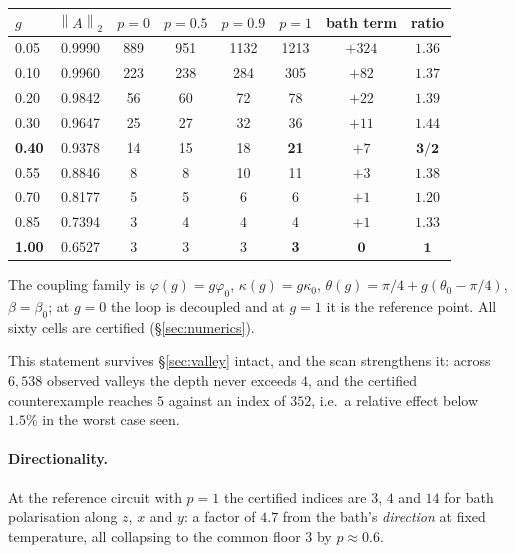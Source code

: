 \documentclass[11pt,a4paper]{article}
\theoremstyle{definition}
\theoremstyle{remark}
\newcommand{\opn}[1]{\left\lVert #1 \right\rVert_{2}}
\begin{document}
\begin{center}
\begin{tabular}{lccccccc}
\toprule
$g$ & $\opn{A}$ & $p=0$ & $p=0.5$ & $p=0.9$ & $p=1$ & bath term & ratio\\
\midrule
0.05 & 0.9990 & 889 & 951 & 1132 & 1213 & $+324$ & $1.36$\\
0.10 & 0.9960 & 223 & 238 & 284 & 305 & $+82$ & $1.37$\\
0.20 & 0.9842 & 56 & 60 & 72 & 78 & $+22$ & $1.39$\\
0.30 & 0.9647 & 25 & 27 & 32 & 36 & $+11$ & $1.44$\\
\textbf{0.40} & 0.9378 & 14 & 15 & 18 & \textbf{21} & $+7$ & $\mathbf{3/2}$\\
0.55 & 0.8846 & 8 & 8 & 10 & 11 & $+3$ & $1.38$\\
0.70 & 0.8177 & 5 & 5 & 6 & 6 & $+1$ & $1.20$\\
0.85 & 0.7394 & 3 & 4 & 4 & 4 & $+1$ & $1.33$\\
\textbf{1.00} & 0.6527 & 3 & 3 & 3 & \textbf{3} & $\mathbf{0}$ & $\mathbf{1}$\\
\bottomrule
\end{tabular}
\end{center}

\noindent The coupling family is $\varphi(g) = g\varphi_0$, $\kappa(g) = g\kappa_0$, $\theta(g) = \pi/4 + g(\theta_0-\pi/4)$, $\beta = \beta_0$; at $g=0$ the loop is decoupled and at $g=1$ it is the reference point. All sixty cells are certified (\S\ref{sec:numerics}).

\begin{center}
\end{center}

This statement survives \S\ref{sec:valley} intact, and the scan strengthens it: across $6{,}538$ observed valleys the depth never exceeds $4$, and the certified counterexample reaches $5$ against an index of $352$, i.e.\ a relative effect below $1.5\%$ in the worst case seen.

\paragraph{Directionality.} At the reference circuit with $p=1$ the certified indices are $3$, $4$ and $14$ for bath polarisation along $z$, $x$ and $y$: a factor of $4.7$ from the bath's \emph{direction} at fixed temperature, all collapsing to the common floor $3$ by $p \approx 0.6$.
\end{document}
